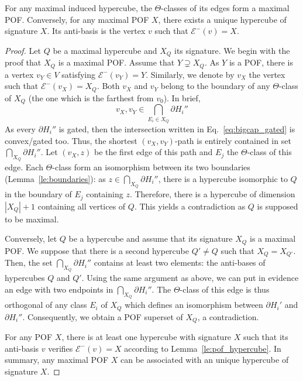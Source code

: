 \documentclass[a4paper,UKenglish,numberwithinsect,cleveref, autoref]{lipics-v2021}
\newcommand{\card}[1]{\left| #1 \right|}
\begin{document}
\begin{theorem}
For any maximal induced hypercube, the $\Theta$-classes of its edges form a maximal POF.
Conversely, for any maximal POF $X$, there exists a unique hypercube of signature $X$. Its anti-basis is the vertex $v$ such that $\mathcal{E}^-(v) = X$. 
\label{th:maximal_pofs}
\end{theorem}
\begin{proof}
Let $Q$ be a maximal hypercube and $X_Q$ its signature. We begin with the proof that $X_Q$ is a maximal POF. Assume that $Y \supsetneq X_Q$. As $Y$ is a POF, there is a vertex $v_Y \in V$ satisfying $\mathcal{E}^-(v_Y) = Y$. Similarly, we denote by $v_X$ the vertex such that $\mathcal{E}^-(v_X) = X_Q$. Both $v_X$ and $v_Y$ belong to the boundary of any $\Theta$-class of $X_Q$ (the one which is the farthest from $v_0$). In brief, 
\begin{equation}v_X,v_Y \in \bigcap_{E_i \in X_Q} \partial H_i''
\label{eq:bigcap_gated}
\end{equation}
As every $\partial H_i''$ is gated, then the intersection written in Eq.~\eqref{eq:bigcap_gated} is convex/gated too. Thus, the shortest $(v_X,v_Y)$-path is entirely contained in set $\bigcap_{X_Q} \partial H_i''$. Let $(v_X,z)$ be the first edge of this path and $E_j$ the $\Theta$-class of this edge. Each $\Theta$-class form an isomorphism between its two boundaries (Lemma~\ref{le:boundaries}): as $z \in \bigcap_{X_Q} \partial H_i''$, there is a hypercube isomorphic to $Q$ in the boundary of $E_j$ containing $z$. Therefore, there is a hypercube of dimension $\card{X_Q}+1$ containing all vertices of $Q$. This yields a contradiction as $Q$ is supposed to be maximal.

Conversely, let $Q$ be a hypercube and assume that its signature $X_Q$ is a maximal POF. We suppose that there is a second hypercube $Q' \neq Q$ such that $X_Q = X_{Q'}$. Then, the set $\bigcap_{X_Q} \partial H_i''$ contains at least two elements: the anti-bases of hypercubes $Q$ and $Q'$. Using the same argument as above, we can put in evidence an edge with two endpoints in $\bigcap_{X_Q} \partial H_i''$. The $\Theta$-class of this edge is thus orthogonal of any class $E_i$ of $X_Q$ which defines an isomorphism between $\partial H_i'$ and $\partial H_i''$. Consequently, we obtain a POF superset of $X_Q$, a contradiction.

For any POF $X$, there is at least one hypercube with signature $X$ such that its anti-basis $v$ verifies $\mathcal{E}^-(v) = X$ according to Lemma~\ref{le:pof_hypercube}. In summary, any maximal POF $X$ can be associated with an unique hypercube of signature $X$.
\end{proof}
\end{document}
